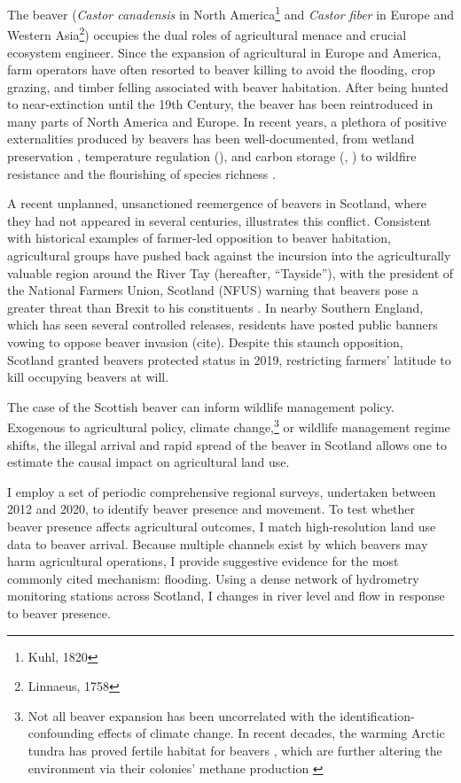 The beaver (\textit{Castor canadensis} in North America\footnote{Kuhl, 1820} and \textit{Castor fiber} in Europe and Western Asia\footnote{Linnaeus, 1758}) occupies the dual roles of agricultural menace and crucial ecosystem engineer. Since the expansion of agricultural in Europe and America, farm operators have often resorted to beaver killing to avoid the flooding, crop grazing, and timber felling associated with beaver habitation. After being hunted to near-extinction until the 19th Century, the beaver has been reintroduced in many parts of North America and Europe. In recent years, a plethora of positive externalities produced by beavers has been well-documented, from wetland preservation \citep{hood_beaver_2008}, temperature regulation (\cite{dittbrenner_relocated_2022}), and carbon storage (\cite{wohl_landscape-scale_2013}, \cite{johnston_beaver_2014}) to wildfire resistance \citep{fairfax_smokey_2020} and the flourishing of species richness \citep{wright_ecosystem_2002}.

A recent unplanned, unsanctioned reemergence of beavers in Scotland, where they had not appeared in several centuries, illustrates this conflict. Consistent with historical examples of farmer-led opposition to beaver habitation, agricultural groups have pushed back against the incursion into the agriculturally valuable region around the River Tay (hereafter, ``Tayside''), with the president of the National Farmers Union, Scotland (NFUS) warning that beavers pose a greater threat than Brexit to his constituents \citep{castle_beavers_2021}. In nearby Southern England, which has seen several controlled releases, residents have posted public banners vowing to oppose beaver invasion (cite). Despite this staunch opposition, Scotland granted beavers protected status in 2019, restricting farmers' latitude to kill occupying beavers at will.

The case of the Scottish beaver can inform wildlife management policy. Exogenous to agricultural policy, climate change,\footnote{Not all beaver expansion has been uncorrelated with the identification-confounding effects of climate change. In recent decades, the warming Arctic tundra has proved fertile habitat for beavers \citep{tape_expanding_2022}, which are further altering the environment via their colonies' methane production \citep{clark_beaver_2023}} or wildlife management regime shifts, the illegal arrival and rapid spread of the beaver in Scotland  allows one to estimate the causal impact on agricultural land use.

I employ a set of periodic comprehensive regional surveys, undertaken between 2012 and 2020, to identify beaver presence and movement. To test whether beaver presence affects agricultural outcomes, I match high-resolution land use data to beaver arrival. Because multiple channels exist by which beavers may harm agricultural operations, I provide suggestive evidence for the most commonly cited mechanism: flooding. Using a dense network of hydrometry monitoring stations across Scotland, I changes in river level and flow in response to beaver presence.

